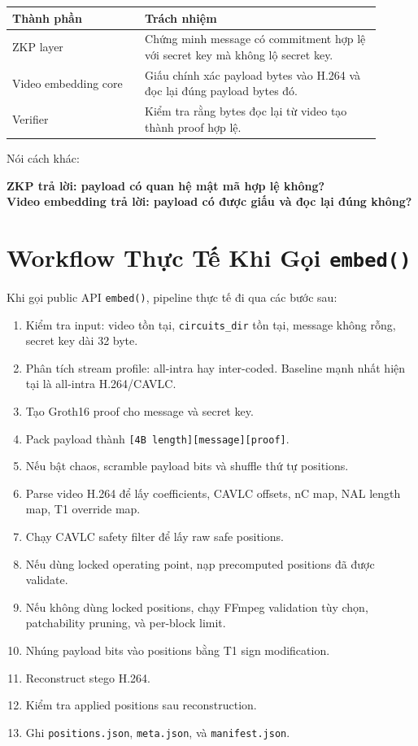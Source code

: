 \documentclass[11pt,a4paper]{article}
\begin{document}
\begin{center}
\begin{tabular}{p{0.32\linewidth}p{0.58\linewidth}}
\toprule
Thành phần & Trách nhiệm \\
\midrule
ZKP layer & Chứng minh message có commitment hợp lệ với secret key mà không lộ secret key. \\
Video embedding core & Giấu chính xác payload bytes vào H.264 và đọc lại đúng payload bytes đó. \\
Verifier & Kiểm tra rằng bytes đọc lại từ video tạo thành proof hợp lệ. \\
\bottomrule
\end{tabular}
\end{center}

Nói cách khác:

\begin{center}
\textbf{ZKP trả lời: payload có quan hệ mật mã hợp lệ không?}\\
\textbf{Video embedding trả lời: payload có được giấu và đọc lại đúng không?}
\end{center}

\section{Workflow Thực Tế Khi Gọi \texttt{embed()}}

Khi gọi public API \texttt{embed()}, pipeline thực tế đi qua các bước sau:

\begin{enumerate}[leftmargin=*]
  \item Kiểm tra input: video tồn tại, \texttt{circuits\_dir} tồn tại, message không rỗng, secret key dài 32 byte.
  \item Phân tích stream profile: all-intra hay inter-coded. Baseline mạnh nhất hiện tại là all-intra H.264/CAVLC.
  \item Tạo Groth16 proof cho message và secret key.
  \item Pack payload thành \texttt{[4B length][message][proof]}.
  \item Nếu bật chaos, scramble payload bits và shuffle thứ tự positions.
  \item Parse video H.264 để lấy coefficients, CAVLC offsets, nC map, NAL length map, T1 override map.
  \item Chạy CAVLC safety filter để lấy raw safe positions.
  \item Nếu dùng locked operating point, nạp precomputed positions đã được validate.
  \item Nếu không dùng locked positions, chạy FFmpeg validation tùy chọn, patchability pruning, và per-block limit.
  \item Nhúng payload bits vào positions bằng T1 sign modification.
  \item Reconstruct stego H.264.
  \item Kiểm tra applied positions sau reconstruction.
  \item Ghi \texttt{positions.json}, \texttt{meta.json}, và \texttt{manifest.json}.
\end{enumerate}
\end{document}
